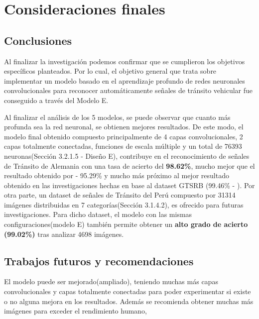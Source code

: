 \chapter{Consideraciones finales}
\setcounter{page}{138}
\renewcommand{\baselinestretch}{2} %
\textheight 21cm

\section{Conclusiones}

	Al finalizar la investigación podemos confirmar que se cumplieron los objetivos específicos planteados. Por lo cual, el objetivo general que trata sobre implementar un modelo basado en el aprendizaje profundo de redes neuronales convolucionales para reconocer automáticamente señales de tránsito vehicular fue conseguido a través del Modelo E.

	\vskip 0.2cm
	Al finalizar el análisis de los 5 modelos, se puede observar que cuanto más profunda sea la red neuronal, se obtienen mejores resultados. De este modo, el modelo final obtenido compuesto principalmente de 4 capas convolucionales, 2 capas totalmente conectadas, funciones de escala múltiple y un total de 76393 neuronas(Sección 3.2.1.5 - Diseño E), contribuye en el reconocimiento de señales de Tránsito de Alemania con una tasa de acierto del {\bf 98.62\%}, mucho mejor que el resultado obtenido por \citep{Ayuque2016} - 95.29\% y mucho más próximo al mejor resultado obtenido en las investigaciones hechas en base al dataset GTSRB (99.46\% - \citep{Ciresan}).
	\vskip 0.2cm
	Por otra parte, un dataset de señales de Tránsito del Perú compuesto por 31314 imágenes distribuidas en 7 categorías(Sección 3.1.4.2), es ofrecido para futuras investigaciones. Para dicho dataset, el modelo con las mismas configuraciones(modelo E) también permite obtener un {\bf alto grado de acierto (99.02\%)} tras analizar 4698 imágenes. 
	 


\section{Trabajos futuros y recomendaciones}


	El modelo puede ser mejorado(ampliado), teniendo muchas más capas convolucionales y capas totalmente conectadas para poder experimentar si existe o no alguna mejora en los resultados. Además se recomienda obtener muchas más imágenes para exceder el rendimiento humano, \citep{Goodfellow-et-al-2016}

